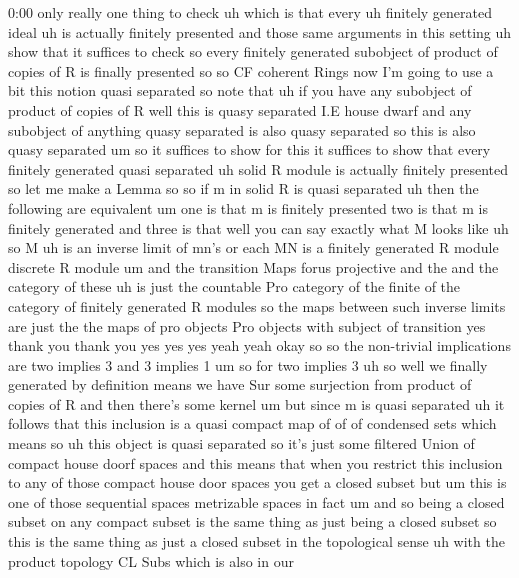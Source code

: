 \begin{unfinished}{0:00}
only  really  one  thing  to  check  uh  which
is  that  every  uh  finitely  generated
ideal  uh  is  actually  finitely  presented
and  those  same  arguments  in  this  setting
uh  show  that  it  suffices  to
check  so
every  finitely  generated
subobject  of  product  of  copies  of  R  is
finally
presented  so
so  CF  coherent
Rings  now  I'm  going  to  use  a  bit  this
notion  quasi  separated  so  note  that  uh
if  you  have  any  subobject  of  product  of
copies  of  R  well  this  is  quasy  separated
I.E  house  dwarf  and  any  subobject  of
anything  quasy  separated  is  also  quasy
separated  so  this  is  also  quasy
separated  um  so  it  suffices  to
show  for
this  it  suffices  to  show  that  every
finitely  generated  quasi  separated  uh
solid  R  module  is  actually  finitely
presented  so  let  me  make  a  Lemma
so  so  if  m  in  solid
R  is  quasi
separated  uh  then  the  following  are
equivalent  um  one  is  that  m  is  finitely
presented  two  is  that  m  is  finitely
generated  and  three  is  that  well  you  can
say  exactly  what  M  looks  like  uh  so  M  uh
is  an  inverse  limit  of  mn's  or  each  MN
is  a  finitely  generated  R  module
discrete  R  module  um  and  the  transition
Maps  forus
projective
and  the  and  the  category  of
these  uh  is  just  the  countable  Pro
category  of  the  finite  of  the  category
of  finitely  generated  R
modules  so  the  maps  between  such  inverse
limits  are  just  the  the  maps  of  pro
objects  Pro  objects  with  subject  of
transition  yes  thank  you  thank  you  yes
yes
yes
yeah
yeah  okay
so
so  the  non-trivial  implications  are  two
implies  3  and  3  implies
1  um  so  for  two  implies
3  uh
so  well  we  finally  generated  by
definition  means  we  have  Sur  some
surjection
from  product  of  copies  of
R  and  then  there's  some  kernel
um  but  since  m  is  quasi
separated  uh  it  follows  that  this
inclusion  is  a  quasi  compact
map  of  of  of  condensed
sets  which  means  so  uh  this  object  is
quasi  separated  so  it's  just  some
filtered  Union  of  compact  house  doorf
spaces  and  this  means  that  when  you
restrict  this  inclusion  to  any  of  those
compact  house  door  spaces  you  get  a
closed
subset  but  um  this  is  one  of  those
sequential  spaces  metrizable  spaces  in
fact  um  and  so  being  a  closed  subset  on
any  compact  subset  is  the  same  thing  as
just  being  a  closed  subset  so  this  is
the  same  thing  as  just  a  closed  subset
in  the  topological
sense
uh  with  the  product
topology  CL  Subs  which  is  also  in  our

\end{unfinished}
